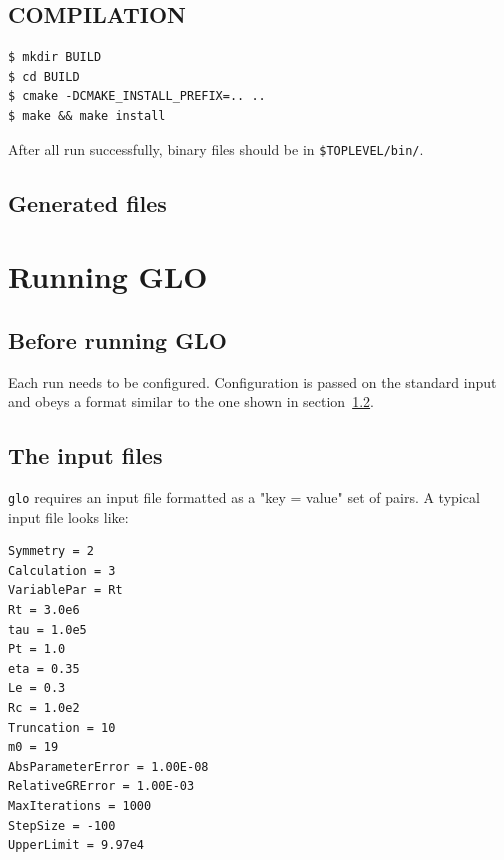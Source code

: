 \documentclass[a4paper,10pt]{book}
\begin{document}
\subsection{COMPILATION}
\begin{verbatim}
$ mkdir BUILD
$ cd BUILD
$ cmake -DCMAKE_INSTALL_PREFIX=.. ..
$ make && make install
\end{verbatim}
After all run successfully, binary files should be in \verb|$TOPLEVEL/bin/|.

\subsection{Generated files}


\section{Running GLO}
\subsection{Before running GLO}
\label{s:runConfig}
Each run needs to be configured. Configuration is passed on the standard input
and obeys a format similar to the one shown in section~\ref{s:inputs}.

\subsection{The input files}
\label{s:inputs}
\verb|glo| requires an input file formatted as a "key =  value" set of pairs.
A typical input file looks like:
\begin{verbatim}
Symmetry = 2
Calculation = 3
VariablePar = Rt
Rt = 3.0e6 
tau = 1.0e5 
Pt = 1.0 
eta = 0.35 
Le = 0.3 
Rc = 1.0e2
Truncation = 10 
m0 = 19
AbsParameterError = 1.00E-08 
RelativeGRError = 1.00E-03 
MaxIterations = 1000
StepSize = -100 
UpperLimit = 9.97e4
\end{verbatim}
\end{document}
